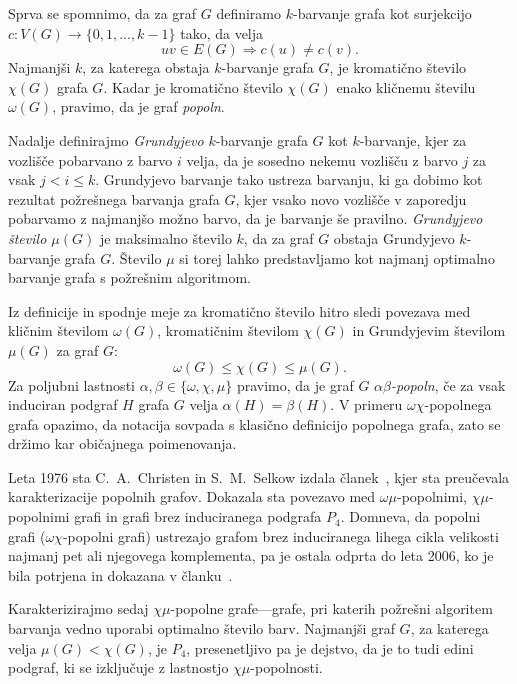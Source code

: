 \documentclass[12pt,a4paper,twoside]{article}
\theoremstyle{definition} %
\theoremstyle{plain} %
\numberwithin{equation}{section}  %
\begin{document}
\medskip
Sprva se spomnimo, da za graf $G$ definiramo $k$-barvanje grafa kot surjekcijo $c: V(G) \rightarrow \{0, 1, ..., k-1\}$ tako, da velja $$uv \in E(G) \Rightarrow c(u) \neq c(v).$$ Najmanjši $k$, za katerega obstaja $k$-barvanje grafa $G$, je kromatično število $\chi(G)$ grafa $G$. Kadar je kromatično število $\chi(G)$ enako kličnemu številu $\omega(G)$, pravimo, da je graf \emph{popoln}.  

\medskip
Nadalje definirajmo \emph{Grundyjevo} $k$-barvanje grafa $G$ kot $k$-barvanje, kjer za vozlišče pobarvano z barvo $i$ velja, da je sosedno nekemu vozlišču z barvo $j$ za vsak $j < i \leq k$. Grundyjevo barvanje tako ustreza barvanju, ki ga dobimo kot rezultat požrešnega barvanja grafa $G$, kjer vsako novo vozlišče v zaporedju  pobarvamo z najmanjšo možno barvo, da je barvanje še pravilno. \emph{Grundyjevo število $\mu(G)$} je maksimalno število $k$, da za graf $G$ obstaja Grundyjevo $k$-barvanje grafa $G$. Število $\mu$ si torej lahko predstavljamo kot najmanj optimalno barvanje grafa s požrešnim algoritmom.

Iz definicije in spodnje meje za kromatično število hitro sledi povezava med kličnim številom $\omega(G)$, kromatičnim številom $\chi(G)$ in Grundyjevim številom $\mu(G)$ za graf $G$: $$\omega(G) \leq \chi(G) \leq \mu(G).$$ Za poljubni lastnosti $\alpha, \beta \in \{\omega, \chi, \mu\}$ pravimo, da je graf $G$ \emph{$\alpha\beta$-popoln}, če za vsak induciran podgraf $H$ grafa $G$ velja $\alpha(H) = \beta(H)$. V primeru $\omega\chi$-popolnega grafa opazimo, da notacija sovpada s klasično definicijo popolnega grafa, zato se držimo kar običajnega poimenovanja.

Leta 1976 sta C.~A.~Christen in S.~M.~Selkow izdala članek~\cite{christen1979some}, kjer sta preučevala karakterizacije popolnih grafov. Dokazala sta povezavo med $\omega\mu$-popolnimi, $\chi\mu$-popolnimi grafi in grafi brez induciranega podgrafa $P_4$. Domneva, da popolni grafi ($\omega\chi$-popolni grafi) ustrezajo grafom brez induciranega lihega cikla velikosti najmanj pet ali njegovega komplementa, pa je ostala odprta do leta 2006, ko je bila potrjena in dokazana v članku~\cite{chudnovsky2006strong}. 

Karakterizirajmo sedaj $\chi\mu$-popolne grafe---grafe, pri katerih požrešni algoritem barvanja vedno  uporabi optimalno število barv. Najmanjši graf $G$, za katerega velja $\mu(G) < \chi(G)$, je $P_4$, presenetljivo pa je dejstvo, da je to tudi edini podgraf, ki se izključuje z lastnostjo $\chi\mu$-popolnosti.
\end{document}
